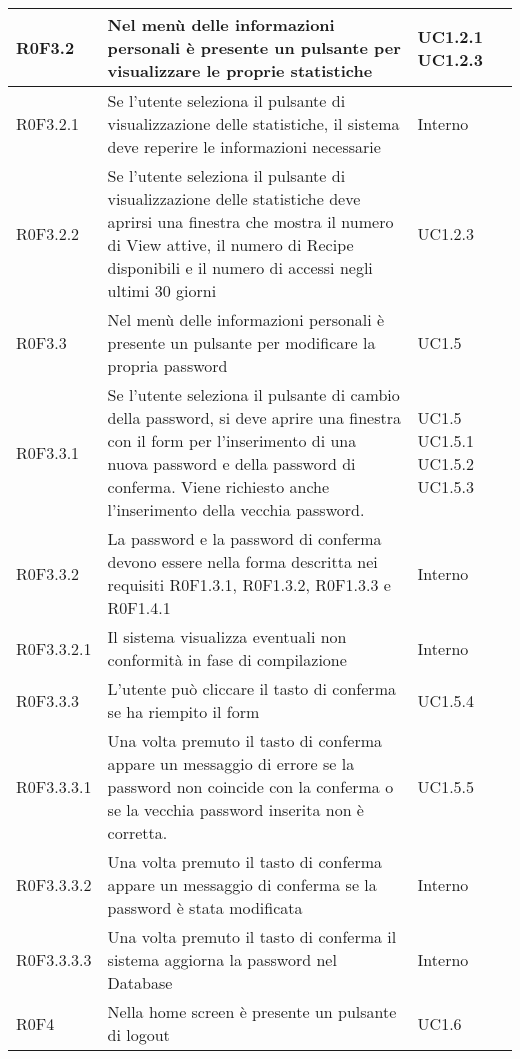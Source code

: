 \begin{center}
\begin{longtable}{| p{2cm} | p{8cm} | p{2cm} |}
		\hline
		R0F3.2  &  Nel menù delle informazioni personali è presente un pulsante per visualizzare le proprie statistiche &  UC1.2.1 \newline UC1.2.3 \\
		\hline
		R0F3.2.1  &  Se l'utente seleziona il pulsante di visualizzazione delle statistiche, il sistema deve reperire le informazioni necessarie  &  Interno \\
		\hline
		R0F3.2.2  &  Se l'utente seleziona il pulsante di visualizzazione delle statistiche deve aprirsi una finestra che mostra il numero di View attive, il numero di Recipe disponibili e il numero di accessi negli ultimi 30 giorni &  UC1.2.3 \\
		\hline
		R0F3.3  &  Nel menù delle informazioni personali è presente un pulsante per modificare la propria password &  UC1.5 \\
		\hline
		R0F3.3.1  &  Se l'utente seleziona il pulsante di cambio della password, si deve aprire una finestra con il form per l'inserimento di una nuova password e della password di conferma. Viene richiesto anche l'inserimento della vecchia password. &  UC1.5 \newline UC1.5.1 \newline UC1.5.2 \newline UC1.5.3 \\
		\hline
		R0F3.3.2  &  La password e la password di conferma devono essere nella forma descritta nei requisiti R0F1.3.1, R0F1.3.2, R0F1.3.3 e R0F1.4.1  &  Interno \\
		\hline
		R0F3.3.2.1  &  Il sistema visualizza eventuali non conformità in fase di compilazione  &  Interno \\
		\hline
		R0F3.3.3  &  L'utente può cliccare il tasto di conferma se ha riempito il form  &  UC1.5.4 \\
		\hline
		R0F3.3.3.1  &  Una volta premuto il tasto di conferma appare un messaggio di errore se la password non coincide con la conferma o se la vecchia password inserita non è corretta.  &  UC1.5.5 \\
		\hline
		R0F3.3.3.2  &  Una volta premuto il tasto di conferma appare un messaggio di conferma se la password è stata modificata  &  Interno \\
		\hline
		R0F3.3.3.3  &  Una volta premuto il tasto di conferma il sistema aggiorna la password nel Database  &  Interno \\
		\hline
		R0F4  &  Nella home screen è presente un pulsante di logout  &  UC1.6 \\
		\hline

\end{longtable}
\end{center}

